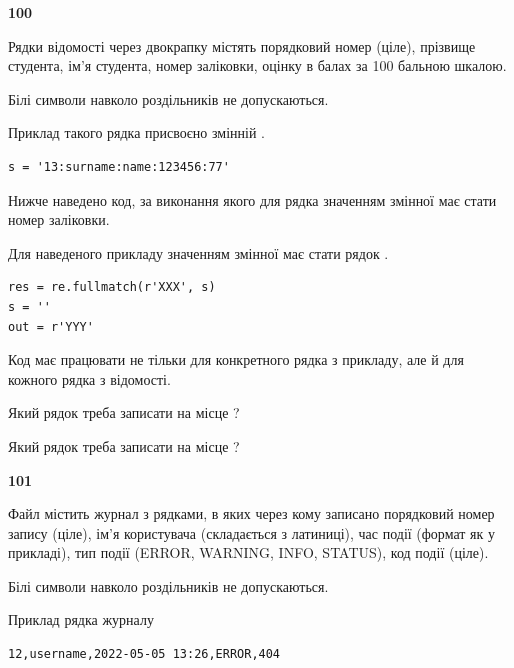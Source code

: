 \newpage

{\begin {center}\textbf{ 100}\end {center}}\par
Рядки відомості через двокрапку містять порядковий номер (ціле), пріз\-ви\-ще студен\-та, ім'я студента, номер заліковки, оцінку в балах за 100 бальною шкалою.

Білі символи навколо роздільників не допускаються.

Приклад такого рядка присвоєно змінній .



\begin{verbatim}
s = '13:surname:name:123456:77'
\end{verbatim}


Нижче наведено код, за виконання якого для рядка  значенням змінної  має стати номер заліковки.

Для наведеного прикладу значенням змінної  має стати рядок  .



\begin{verbatim}
res = re.fullmatch(r'XXX', s)
s = ''
out = r'YYY'
\end{verbatim}


Код має працювати не тільки для конкретного рядка з прикладу, але й для кожного рядка з відомості.




Який рядок треба записати на місце  ?\par
\vspace{5mm}


Який рядок треба записати на місце  ?\par


\newpage

{\begin {center}\textbf{ 101}\end {center}}\par
Файл  містить журнал з рядками, в яких через кому записано поряд\-ко\-вий номер запису (ціле), ім'я користувача (складається з латиниці), час події (фор\-мат як у прикладі), тип події (ERROR, WARNING, INFO, STATUS), код події (ціле).

Білі символи навколо роздільників не допускаються.

Приклад рядка журналу



\begin{verbatim}
12,username,2022-05-05 13:26,ERROR,404
\end{verbatim}


